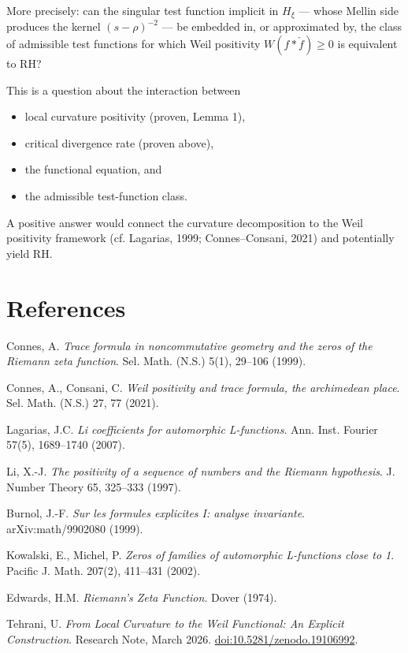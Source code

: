 \documentclass[11pt]{article}
\begin{document}
More precisely: can the singular test function implicit in $H_{\xi}$ --- whose Mellin side produces the kernel $(s-\rho)^{-2}$ --- be embedded in, or approximated by, the class of admissible test functions for which Weil positivity $W(f*\check f)\ge 0$ is equivalent to RH?

This is a question about the interaction between
\begin{itemize}[leftmargin=2em]
\item local curvature positivity (proven, Lemma 1),
\item critical divergence rate (proven above),
\item the functional equation, and
\item the admissible test-function class.
\end{itemize}
A positive answer would connect the curvature decomposition to the Weil positivity framework (cf. Lagarias, 1999; Connes--Consani, 2021) and potentially yield RH.

\section*{References}
\begin{enumerate}[label={[\arabic*]},leftmargin=2em]
\item Connes, A. \emph{Trace formula in noncommutative geometry and the zeros of the Riemann zeta function}. Sel. Math. (N.S.) 5(1), 29--106 (1999).
\item Connes, A., Consani, C. \emph{Weil positivity and trace formula, the archimedean place}. Sel. Math. (N.S.) 27, 77 (2021).
\item Lagarias, J.C. \emph{Li coefficients for automorphic L-functions}. Ann. Inst. Fourier 57(5), 1689--1740 (2007).
\item Li, X.-J. \emph{The positivity of a sequence of numbers and the Riemann hypothesis}. J. Number Theory 65, 325--333 (1997).
\item Burnol, J.-F. \emph{Sur les formules explicites I: analyse invariante}. arXiv:math/9902080 (1999).
\item Kowalski, E., Michel, P. \emph{Zeros of families of automorphic L-functions close to 1}. Pacific J. Math. 207(2), 411--431 (2002).
\item Edwards, H.M. \emph{Riemann's Zeta Function}. Dover (1974).
\item Tehrani, U. \emph{From Local Curvature to the Weil Functional: An Explicit Construction}. Research Note, March 2026.
\href{https://doi.org/10.5281/zenodo.19106992}{doi:10.5281/zenodo.19106992}.
\end{enumerate}
\end{document}
